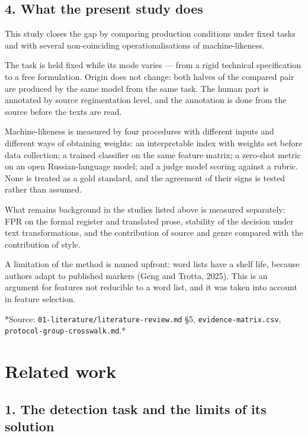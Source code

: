\documentclass[11pt,a4paper]{article}
\renewcommand{\_}{\textunderscore\allowbreak}
\begin{document}
\subsection{4. What the present study does}

This study closes the gap by comparing production conditions under fixed
tasks and with several non-coinciding operationalisations of machine-likeness.

The task is held fixed while its mode varies — from a rigid technical specification
to a free formulation. Origin does not change: both halves of the
compared pair are produced by the same model from the same task. The human part
is annotated by source regimentation level, and the annotation is done from the
source before the texts are read.

Machine-likeness is measured by four procedures with different inputs and different ways of
obtaining weights: an interpretable index with weights set before data collection;
a trained classifier on the same feature matrix; a zero-shot metric on an
open Russian-language model; and a judge model scoring against a rubric. None is treated as a
gold standard, and the agreement of their signs is tested rather than assumed.

What remains background in the studies listed above is measured separately: FPR on the
formal register and translated prose, stability of the decision under text transformations,
and the contribution of source and genre compared with the contribution of style.

A limitation of the method is named upfront: word lists have a shelf life, because
authors adapt to published markers (Geng and Trotta, 2025). This is an argument for
features not reducible to a word list, and it was taken into account in feature selection.

*Source: \texttt{01-\allowbreak{}literature/literature-\allowbreak{}review.md} §5, \texttt{evidence-\allowbreak{}matrix.csv},
\texttt{protocol-\allowbreak{}group-\allowbreak{}crosswalk.md}.*

\section{Related work}

\subsection{1. The detection task and the limits of its solution}
\end{document}
